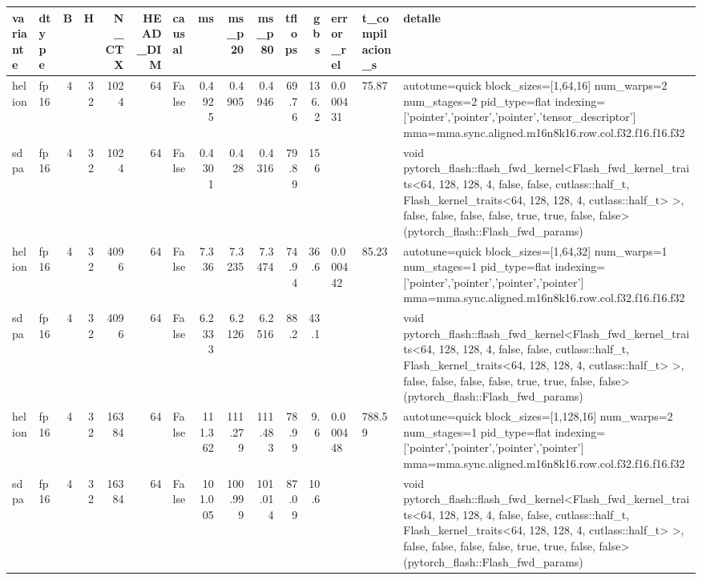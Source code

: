 \begin{table}[htbp]
  \centering\small
  \begin{tabular}{llrrrrlrrrrrlll}
    \toprule
    variante & dtype & B & H & N\_CTX & HEAD\_DIM & causal & ms & ms\_p20 & ms\_p80 & tflops & gbs & error\_rel & t\_compilacion\_s & detalle \\
    \midrule
    helion & fp16 & 4 & 32 & 1024 & 64 & False & 0.4925 & 0.4905 & 0.4946 & 69.76 & 136.2 & 0.000431 & 75.87 & autotune=quick block\_sizes=[1,64,16] num\_warps=2 num\_stages=2 pid\_type=flat indexing=['pointer','pointer','pointer','tensor\_descriptor'] mma=mma.sync.aligned.m16n8k16.row.col.f32.f16.f16.f32 \\
    sdpa & fp16 & 4 & 32 & 1024 & 64 & False & 0.4301 & 0.428 & 0.4316 & 79.89 & 156 &  &  & void pytorch\_flash::flash\_fwd\_kernel<Flash\_fwd\_kernel\_traits<64, 128, 128, 4, false, false, cutlass::half\_t, Flash\_kernel\_traits<64, 128, 128, 4, cutlass::half\_t> >, false, false, false, false, true, true, false, false>(pytorch\_flash::Flash\_fwd\_params) \\
    helion & fp16 & 4 & 32 & 4096 & 64 & False & 7.336 & 7.3235 & 7.3474 & 74.94 & 36.6 & 0.000442 & 85.23 & autotune=quick block\_sizes=[1,64,32] num\_warps=1 num\_stages=1 pid\_type=flat indexing=['pointer','pointer','pointer','pointer'] mma=mma.sync.aligned.m16n8k16.row.col.f32.f16.f16.f32 \\
    sdpa & fp16 & 4 & 32 & 4096 & 64 & False & 6.2333 & 6.2126 & 6.2516 & 88.2 & 43.1 &  &  & void pytorch\_flash::flash\_fwd\_kernel<Flash\_fwd\_kernel\_traits<64, 128, 128, 4, false, false, cutlass::half\_t, Flash\_kernel\_traits<64, 128, 128, 4, cutlass::half\_t> >, false, false, false, false, true, true, false, false>(pytorch\_flash::Flash\_fwd\_params) \\
    helion & fp16 & 4 & 32 & 16384 & 64 & False & 111.362 & 111.279 & 111.483 & 78.99 & 9.6 & 0.000448 & 788.59 & autotune=quick block\_sizes=[1,128,16] num\_warps=2 num\_stages=1 pid\_type=flat indexing=['pointer','pointer','pointer','pointer'] mma=mma.sync.aligned.m16n8k16.row.col.f32.f16.f16.f32 \\
    sdpa & fp16 & 4 & 32 & 16384 & 64 & False & 101.005 & 100.999 & 101.014 & 87.09 & 10.6 &  &  & void pytorch\_flash::flash\_fwd\_kernel<Flash\_fwd\_kernel\_traits<64, 128, 128, 4, false, false, cutlass::half\_t, Flash\_kernel\_traits<64, 128, 128, 4, cutlass::half\_t> >, false, false, false, false, true, true, false, false>(pytorch\_flash::Flash\_fwd\_params) \\

\end{tabular}
\end{table}
